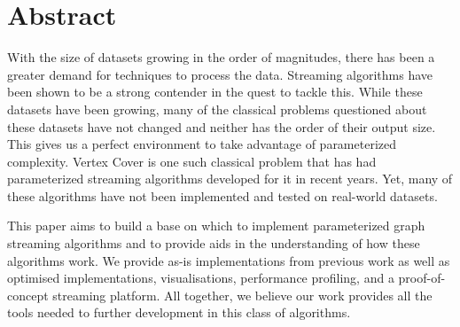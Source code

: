 \section*{Abstract}

With the size of datasets growing in the order of magnitudes, there has
been a greater demand for techniques to process the data. Streaming
algorithms have been shown to be a strong contender in the quest to tackle
this. While these datasets have been growing, many of the classical
problems questioned about these datasets have not changed and neither
has the order of their output size. This gives us a perfect environment
to take advantage of parameterized complexity. Vertex Cover is one such
classical problem that has had parameterized streaming algorithms
developed for it in recent years. Yet, many of these algorithms have not
been implemented and tested on real-world datasets.

This paper aims to build a base on which to implement parameterized graph
streaming algorithms and to provide aids in the understanding of how
these algorithms work. We provide as-is implementations from previous
work as well as optimised implementations, visualisations, performance
profiling, and a proof-of-concept streaming platform. All together, we
believe our work provides all the tools needed to further development in
this class of algorithms.

\pagebreak
